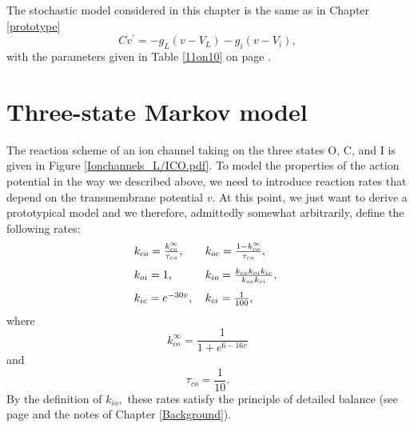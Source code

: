 The stochastic model considered in this chapter is the same as in Chapter \ref{prototype}
\begin{equation}
Cv^{\prime}=-g_{L}\left(  v-V_{L}\right)  -g_{i}(v-V_{i}), \label{v1b}%
\end{equation}
with the parameters given in Table \ref{11on10} on page \pageref{11on10}.



\section{Three-state Markov model}
The reaction scheme of an ion channel taking on the three states O, C, and I
is given in Figure \ref{Ionchannels_L/ICO.pdf}. To model the properties of the action
potential in the way we described above, we need to introduce reaction rates
that depend on the transmembrane potential $v$. At this point, we just want to
derive a prototypical model and we therefore, admittedly somewhat arbitrarily,
define the following rates:%
\begin{equation}%
\begin{tabular}
[c]{ll}%
$k_{co}=\frac{k_{co}^{\infty}}{\tau_{co}}$, & $k_{oc}=\frac{1-k_{co}^{\infty}%
}{\tau_{co}}$,\\[3 mm]
$k_{oi}=1$, & $k_{io}=\frac{k_{co}k_{oi}k_{ic}}{k_{oc}k_{ci}}$,\\[3 mm]
$k_{ic}=e^{-30v}$, & $k_{ci}=\frac{1}{100}$,%
\end{tabular}
\ \label{ratesv}%
\end{equation}
where%
\[
k_{co}^{\infty}  =\frac{1}{1+e^{6-16v}}
\]
and
\[
\tau_{co}  =\frac{1}{10}.
\]
By the definition of $k_{io},$ these rates satisfy the principle of detailed
balance (see page \pageref{db} and the notes of Chapter \ref{Background}).


